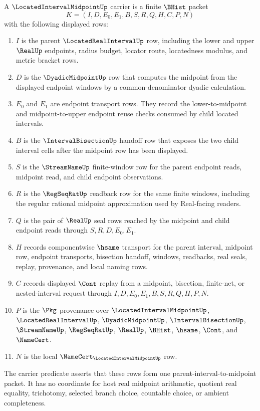 \begin{definition}
\label{def:located-interval-midpoint-carrier}
A $\LocatedIntervalMidpointUp$ carrier is a finite $\BHist$ packet
$$
K=(I,D,E_0,E_1,B,S,R,Q,H,C,P,N)
$$
with the following displayed rows:
\begin{enumerate}
\item $I$ is the parent $\LocatedRealIntervalUp$ row, including the lower and upper $\RealUp$ endpoints, radius budget, locator route, locatedness modulus, and metric bracket rows.
\item $D$ is the $\DyadicMidpointUp$ row that computes the midpoint from the displayed endpoint windows by a common-denominator dyadic calculation.
\item $E_0$ and $E_1$ are endpoint transport rows. They record the lower-to-midpoint and midpoint-to-upper endpoint reuse checks consumed by child located intervals.
\item $B$ is the $\IntervalBisectionUp$ handoff row that exposes the two child interval cells after the midpoint row has been displayed.
\item $S$ is the $\StreamNameUp$ finite-window row for the parent endpoint reads, midpoint read, and child endpoint observations.
\item $R$ is the $\RegSeqRatUp$ readback row for the same finite windows, including the regular rational midpoint approximation used by Real-facing readers.
\item $Q$ is the pair of $\RealUp$ seal rows reached by the midpoint and child endpoint reads through $S,R,D,E_0,E_1$.
\item $H$ records componentwise $\hsame$ transport for the parent interval, midpoint row, endpoint transports, bisection handoff, windows, readbacks, real seals, replay, provenance, and local naming rows.
\item $C$ records displayed $\Cont$ replay from a midpoint, bisection, finite-net, or nested-interval request through $I,D,E_0,E_1,B,S,R,Q,H,P,N$.
\item $P$ is the $\Pkg$ provenance over $\LocatedIntervalMidpointUp$, $\LocatedRealIntervalUp$, $\DyadicMidpointUp$, $\IntervalBisectionUp$, $\StreamNameUp$, $\RegSeqRatUp$, $\RealUp$, $\BHist$, $\hsame$, $\Cont$, and $\NameCert$.
\item $N$ is the local $\NameCert_{\LocatedIntervalMidpointUp}$ row.
\end{enumerate}
The carrier predicate asserts that these rows form one parent-interval-to-midpoint packet. It has no coordinate for host real midpoint arithmetic, quotient real equality, trichotomy, selected branch choice, countable choice, or ambient completeness.
\end{definition}

